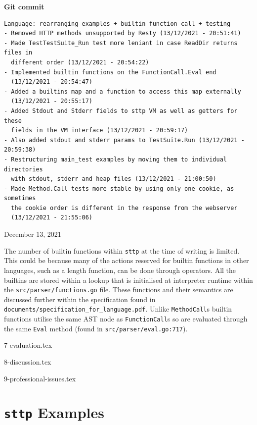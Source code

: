 \documentclass[]{full}
\theoremstyle{definition}
\begin{document}
\begin{center}
    \textbf{Git commit}
    \begin{verbatim}
Language: rearranging examples + builtin function call + testing
- Removed HTTP methods unsupported by Resty (13/12/2021 - 20:51:41)
- Made TestTestSuite_Run test more leniant in case ReadDir returns files in
  different order (13/12/2021 - 20:54:22)
- Implemented builtin functions on the FunctionCall.Eval end
  (13/12/2021 - 20:54:47)
- Added a builtins map and a function to access this map externally
  (13/12/2021 - 20:55:17)
- Added Stdout and Stderr fields to sttp VM as well as getters for these
  fields in the VM interface (13/12/2021 - 20:59:17)
- Also added stdout and stderr params to TestSuite.Run (13/12/2021 - 20:59:38)
- Restructuring main_test examples by moving them to individual directories
  with stdout, stderr and heap files (13/12/2021 - 21:00:50)
- Made Method.Call tests more stable by using only one cookie, as sometimes
  the cookie order is different in the response from the webserver
  (13/12/2021 - 21:55:06)
    \end{verbatim}
    \vspace{-1em}
    \tiny{December 13, 2021}
\end{center}

The number of builtin functions within \verb|sttp| at the time of writing is limited. This could be because many of the actions reserved for builtin functions in other languages, such as a length function, can be done through operators. All the builtins are stored within a lookup that is initialised at interpreter runtime within the \verb|src/parser/functions.go| file. These functions and their semantics are discussed further within the specification found in \verb|documents/specification_for_language.pdf|. Unlike \verb|MethodCall|s builtin functions utilise the same AST node as \verb|FunctionCall|s so are evaluated through the same \verb|Eval| method (found in \verb|src/parser/eval.go:717|).

{7-evaluation.tex}

{8-discussion.tex}

{9-professional-issues.tex}

\appendix

\cprotect\chapter{\verb|sttp| Examples}
\label{appendix:sttp-examples}
\end{document}
